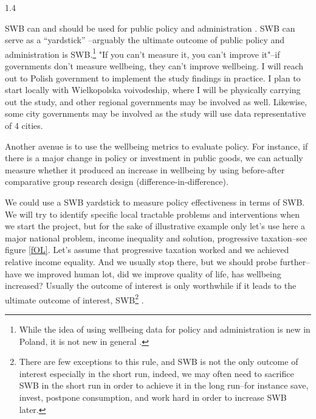 \documentclass[10pt, letterpaper]{article}
\begin{document}
\begin{spacing}{1.4}
{ SWB can and should be used for public policy and administration \citep{diener09}.
% 
 SWB can serve as a ``yardstick'' \citep{veenhoven88}--arguably the ultimate outcome of public
 policy and administration is SWB.\footnote{While the idea of using wellbeing data for policy and
    administration is new in Poland, it is not new in general
    \citep{stiglitz09al,diener09}.} "If you can't measure it, you can't improve
 it"--if governments don't measure wellbeing, they can't improve wellbeing.  
  I will reach out to Polish government to implement the study findings in
  practice. 
  I plan to start locally with Wielkopolska voivodeship,
  where I will be physically carrying out the study, and other regional
  governments may be involved as well. %
  Likewise, some city
  governments may be involved as the study will use data representative of 4
  cities.


  
  Another avenue is to use the wellbeing metrics to evaluate policy. For instance, if
  there is a major change in policy or investment in public goods, we can actually
  measure whether it produced an increase in wellbeing by using before-after
  comparative group research design (difference-in-difference).} We could use a
SWB yardstick to measure policy effectiveness in terms of SWB.
We will try to identify specific local tractable problems and interventions when
we start the project, but for the sake of illustrative example only let's use
here a major national problem, income inequality and solution, progressive
taxation--see figure \ref{fOL}. Let's assume that progressive taxation worked and we
achieved relative income equality.
  And we usually stop there, but
 we should probe further--have we improved human lot, did we improve quality of
 life, has wellbeing increased? Usually the outcome of interest is only
worthwhile if it leads to the ultimate outcome of interest, SWB\footnote{There are few
  exceptions to this rule, and SWB is not the only outcome
 of interest especially in the short run, indeed, we may often 
 need to sacrifice SWB in the short run in order to achieve it in
 the long run--for instance save, invest, postpone consumption, and work
 hard in order to increase SWB later.} \citep{aok_lsPol16}.


\end{spacing}
\end{document}
